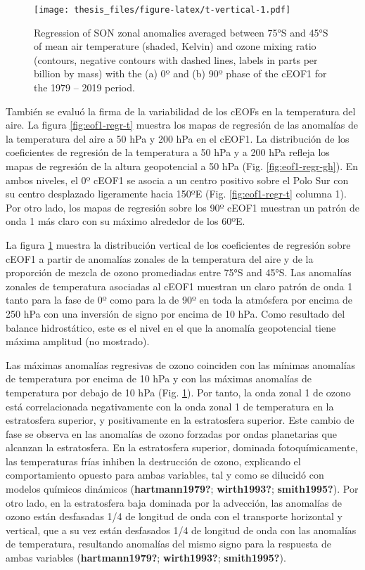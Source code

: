 \documentclass[12pt,oneside]{reedthesis}
\begin{document}
\begin{figure}
\centering
\texttt{[image: thesis\_files/figure-latex/t-vertical-1.pdf]}
\caption{\label{fig:t-vertical}Regression of SON zonal anomalies averaged between 75°S and 45°S of mean air temperature (shaded, Kelvin) and ozone mixing ratio (contours, negative contours with dashed lines, labels in parts per billion by mass) with the (a) 0º and (b) 90º phase of the cEOF1 for the 1979 -- 2019 period.}
\end{figure}
También se evaluó la firma de la variabilidad de los cEOFs en la temperatura del aire.
La figura \ref{fig:eof1-regr-t} muestra los mapas de regresión de las anomalías de la temperatura del aire a 50 hPa y 200 hPa en el cEOF1.
La distribución de los coeficientes de regresión de la temperatura a 50 hPa y a 200 hPa refleja los mapas de regresión de la altura geopotencial a 50 hPa (Fig. \ref{fig:eof1-regr-gh}).
En ambos niveles, el 0º cEOF1 se asocia a un centro positivo sobre el Polo Sur con su centro desplazado ligeramente hacia 150ºE (Fig. \ref{fig:eof1-regr-t} columna 1).
Por otro lado, los mapas de regresión sobre los 90º cEOF1 muestran un patrón de onda 1 más claro con su máximo alrededor de los 60ºE.

La figura \ref{fig:t-vertical} muestra la distribución vertical de los coeficientes de regresión sobre cEOF1 a partir de anomalías zonales de la temperatura del aire y de la proporción de mezcla de ozono promediadas entre 75°S and 45°S.
Las anomalías zonales de temperatura asociadas al cEOF1 muestran un claro patrón de onda 1 tanto para la fase de 0º como para la de 90º en toda la atmósfera por encima de 250 hPa con una inversión de signo por encima de 10 hPa.
Como resultado del balance hidrostático, este es el nivel en el que la anomalía geopotencial tiene máxima amplitud (no mostrado).

Las máximas anomalías regresivas de ozono coinciden con las mínimas anomalías de temperatura por encima de 10 hPa y con las máximas anomalías de temperatura por debajo de 10 hPa (Fig. \ref{fig:t-vertical}).
Por tanto, la onda zonal 1 de ozono está correlacionada negativamente con la onda zonal 1 de temperatura en la estratosfera superior, y positivamente en la estratosfera superior.
Este cambio de fase se observa en las anomalías de ozono forzadas por ondas planetarias que alcanzan la estratosfera.
En la estratosfera superior, dominada fotoquímicamente, las temperaturas frías inhiben la destrucción de ozono, explicando el comportamiento opuesto para ambas variables, tal y como se dilucidó con modelos químicos dinámicos (\textbf{hartmann1979?}; \textbf{wirth1993?}; \textbf{smith1995?}).
Por otro lado, en la estratosfera baja dominada por la advección, las anomalías de ozono están desfasadas 1/4 de longitud de onda con el transporte horizontal y vertical, que a su vez están desfasados 1/4 de longitud de onda con las anomalías de temperatura, resultando anomalías del mismo signo para la respuesta de ambas variables (\textbf{hartmann1979?}; \textbf{wirth1993?}; \textbf{smith1995?}).
\end{document}
